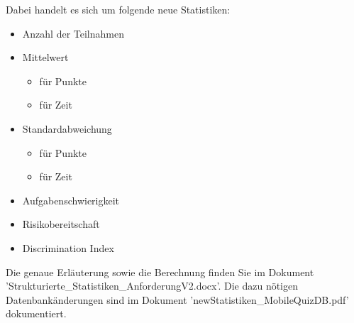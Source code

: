 \bigskip

\noindent Dabei handelt es sich um folgende neue Statistiken:
\begin{itemize}
	\item Anzahl der Teilnahmen
	\item Mittelwert
	\begin{itemize}
		\item für Punkte
		\item für Zeit
	\end{itemize}
	\item Standardabweichung
	\begin{itemize}
		\item für Punkte
		\item für Zeit
	\end{itemize}
	\item Aufgabenschwierigkeit
	\item Risikobereitschaft
	\item Discrimination Index
\end{itemize}

Die genaue Erläuterung sowie die Berechnung finden Sie im Dokument 'Strukturierte\_Statistiken\_AnforderungV2.docx'. Die dazu nötigen Datenbankänderungen sind im Dokument 'newStatistiken\_MobileQuizDB.pdf' dokumentiert.
















